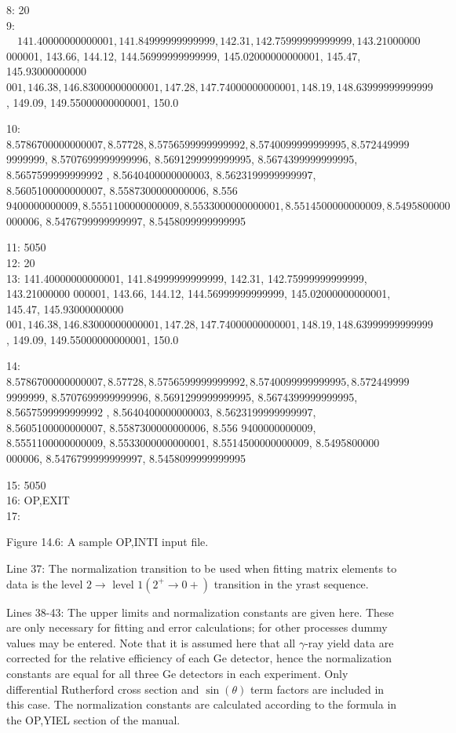 \documentclass[10pt]{article}
\begin{document}
8: 20\\
9: $\quad 141.40000000000001,141.84999999999999,142.31,142.75999999999999,143.21000000$ 000001, 143.66, 144.12, 144.56999999999999, 145.02000000000001, 145.47, 145.93000000000 $001,146.38,146.83000000000001,147.28,147.74000000000001,148.19,148.63999999999999$ , 149.09, 149.55000000000001, 150.0

10: $8.5786700000000007,8.57728,8.5756599999999992,8.5740099999999995,8.572449999$ 9999999, 8.5707699999999996, 8.5691299999999995, 8.5674399999999995, 8.5657599999999992 , 8.5640400000000003, 8.5623199999999997, 8.5605100000000007, 8.5587300000000006, 8.556 $9400000000009,8.5551100000000009,8.5533000000000001,8.5514500000000009,8.5495800000$ 000006, 8.5476799999999997, 8.5458099999999995

11: 5050\\
12: 20\\
13: 141.40000000000001, 141.84999999999999, 142.31, 142.75999999999999, 143.21000000 000001, 143.66, 144.12, 144.56999999999999, 145.02000000000001, 145.47, 145.93000000000 $001,146.38,146.83000000000001,147.28,147.74000000000001,148.19,148.63999999999999$ , 149.09, 149.55000000000001, 150.0

14: $8.5786700000000007,8.57728,8.5756599999999992,8.5740099999999995,8.572449999$ 9999999, 8.5707699999999996, 8.5691299999999995, 8.5674399999999995, 8.5657599999999992 , 8.5640400000000003, 8.5623199999999997, 8.5605100000000007, 8.5587300000000006, 8.556 9400000000009, 8.5551100000000009, 8.5533000000000001, 8.5514500000000009, 8.5495800000 000006, 8.5476799999999997, 8.5458099999999995

15: 5050\\
16: OP,EXIT\\
17:

Figure 14.6: A sample OP,INTI input file.

Line 37: The normalization transition to be used when fitting matrix elements to data is the level $2 \rightarrow$ level $1\left(2^{+} \rightarrow 0+\right)$ transition in the yrast sequence.

Lines 38-43: The upper limits and normalization constants are given here. These are only necessary for fitting and error calculations; for other processes dummy values may be entered. Note that it is assumed here that all $\gamma$-ray yield data are corrected for the relative efficiency of each Ge detector, hence the normalization constants are equal for all three Ge detectors in each experiment. Only differential Rutherford cross section and $\sin (\theta)$ term factors are included in this case. The normalization constants are calculated according to the formula in the OP,YIEL section of the manual.
\end{document}
